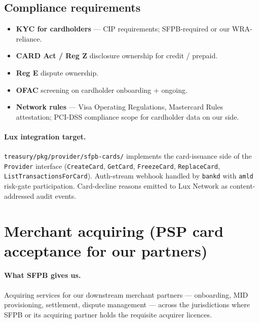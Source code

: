 \documentclass[11pt,letterpaper]{article}
\begin{document}
\subsection{Compliance requirements}
\begin{itemize}[leftmargin=1.6em]
  \item \textbf{KYC for cardholders} --- CIP requirements; SFPB-required
        or our WRA-reliance.
  \item \textbf{CARD Act / Reg Z} disclosure ownership for credit /
        prepaid.
  \item \textbf{Reg E} dispute ownership.
  \item \textbf{OFAC} screening on cardholder onboarding + ongoing.
  \item \textbf{Network rules} --- Visa Operating Regulations,
        Mastercard Rules attestation; PCI-DSS compliance scope for
        cardholder data on our side.
\end{itemize}

\paragraph{Lux integration target.}
\texttt{treasury/pkg/provider/sfpb-cards/} implements the card-issuance
side of the \texttt{Provider} interface (\texttt{CreateCard},
\texttt{GetCard}, \texttt{FreezeCard}, \texttt{ReplaceCard},
\texttt{ListTransactionsForCard}). Auth-stream webhook handled by
\texttt{bankd} with \texttt{amld} risk-gate participation. Card-decline
reasons emitted to Lux Network as content-addressed audit events.

\section{Merchant acquiring (PSP card acceptance for our partners)}

\paragraph{What SFPB gives us.}
Acquiring services for our downstream merchant partners --- onboarding,
MID provisioning, settlement, dispute management --- across the
jurisdictions where SFPB or its acquiring partner holds the requisite
acquirer licences.
\end{document}
